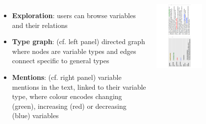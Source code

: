 \documentclass[24pt, a0papper, portrait]{tikzposter}
\newcommand{\point}[1]{\textbf{\textcolor{colorThree}{#1}}:}
\begin{document}
\begin{columns}


{
\begin{itemize}
\item \point{Exploration} users can browse variables and their relations  
\item \point{Type graph} (cf. left panel) directed graph where nodes are variable types and edges connect specific to general types 
\item \point{Mentions} (cf. right panel) variable mentions in the text, linked to their variable type, where colour encodes changing (green), increasing (red) or decreasing (blue) variables
\end{itemize}

\vspace{-1cm}

\begin{tikzfigure}
\includegraphics[angle=-90,width=0.5\textwidth,clip=true,trim=56mm 1mm 53mm 0]{screenshot.pdf}
\end{tikzfigure}

}	
    

    
     


\end{columns}
\end{document}
